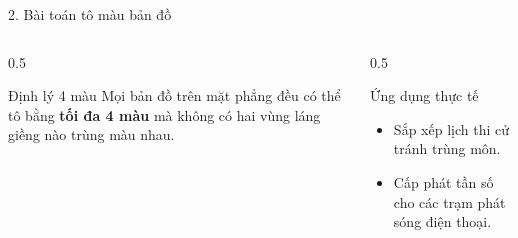 \documentclass[11pt]{beamer}
\newenvironment{mainbox}[1]{\begin{block}{#1}}{\end{block}}
\newenvironment{highlightbox}[1]{\begin{alertblock}{#1}}{\end{alertblock}}
\begin{document}
\begin{frame}{2. Bài toán tô màu bản đồ}
    \begin{columns}[T]
        \begin{column}{0.5\textwidth}
            \begin{mainbox}{Định lý 4 màu}
                Mọi bản đồ trên mặt phẳng đều có thể tô bằng \textbf{tối đa 4 màu} mà không có hai vùng láng giềng nào trùng màu nhau.
            \end{mainbox}
        \end{column}
        \begin{column}{0.5\textwidth}
            \begin{highlightbox}{Ứng dụng thực tế}
                \begin{itemize}
                    \item Sắp xếp lịch thi cử tránh trùng môn.
                    \item Cấp phát tần số cho các trạm phát sóng điện thoại.
                \end{itemize}
            \end{highlightbox}
        \end{column}
    \end{columns}
\end{frame}
\end{document}
